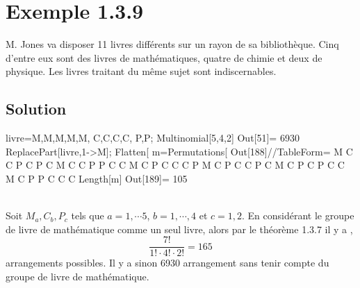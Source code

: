 \section*{Exemple 1.3.9}
M. Jones va disposer 11 livres différents sur un rayon de sa bibliothèque. Cinq d'entre eux sont des livres de mathématiques, quatre de chimie et deux de physique. Les livres traitant du même sujet sont indiscernables.
\subsection*{Solution}
\begin{multicols}{2}
\begin{verbbox}
livre={{M,M,M,M,M},
	{C,C,C,C},
	{P,P}};
Multinomial[5,4,2]
Out[51]= 6930
ReplacePart[livre,1->M];
Flatten[%
m=Permutations[%
Out[188]//TableForm=
M	C	C	P	C	P	C
M	C	C	P	P	C	C
M	C	P	C	C	C	P
M	C	P	C	C	P	C
M	C	P	C	P	C	C
M	C	P	P	C	C	C
Length[m]
Out[189]= 105
\end{verbbox}
	\theverbbox
	\columnbreak
	\\
	Soit $M_a,C_b,P_c$ tels que $a=1,\cdots 5$, $b=1,\cdots,4$ et $c=1,2$. En considérant le groupe de livre de mathématique comme un seul livre, alors par le théorème 1.3.7 il y a ,
	\begin{equation*}
	\frac{7!}{1!\cdot 4!\cdot 2!} = 165
	\end{equation*}
	arrangements possibles. Il y a sinon 6930 arrangement sans tenir compte du groupe de livre de mathématique.
\end{multicols}